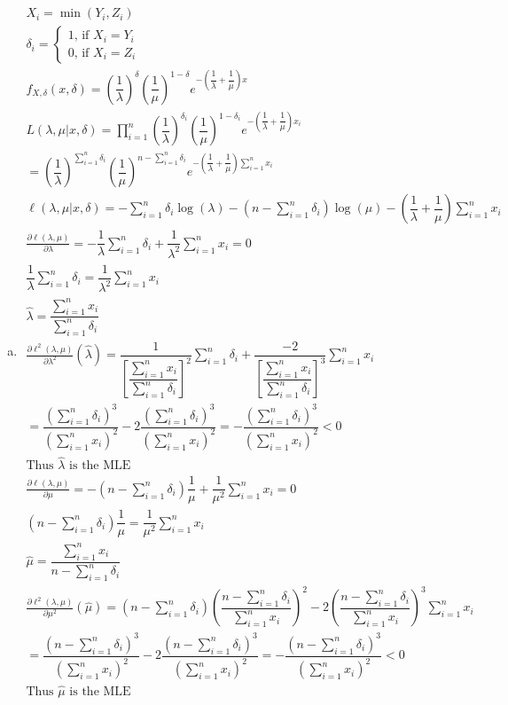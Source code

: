 \documentclass{article}
\newcommand{\pderiv}[2]{\frac{\partial #1}{\partial #2}}
\newcommand{\lm}{\lambda}
\newcommand{\sumn}{\sum_{i=1}^{n}}
\newcommand{\prodn}{\prod_{i=1}^{n}}
\begin{document}
\begin{flushleft}
\begin{enumerate}[(a)]
	\item 
\begin{multline*}\\
X_i=\min(Y_i,Z_i) \\
\delta_i=\begin{cases}
1\text{, if } X_i=Y_i\\
0\text{, if } X_i=Z_i
\end{cases}\\
f_{X,\delta}(x,\delta)=\left(\dfrac{1}{\lm}\right)^{\delta}\left(\dfrac{1}{\mu}\right)^{1-\delta}e^{-\left(\dfrac{1}{\lm}+\dfrac{1}{\mu}\right)x}\\
L(\lm,\mu|x,\delta)=\prodn \left(\dfrac{1}{\lm}\right)^{\delta_i}\left(\dfrac{1}{\mu}\right)^{1-\delta_i}e^{-\left(\dfrac{1}{\lm}+\dfrac{1}{\mu}\right)x_i}\\
=\left(\dfrac{1}{\lm}\right)^{\sumn\delta_i}\left(\dfrac{1}{\mu}\right)^{n-\sumn \delta_i}e^{-\left(\dfrac{1}{\lm}+\dfrac{1}{\mu}\right)\sumn x_i}\\
\ell(\lm,\mu|x,\delta)=-\sumn\delta_i \log(\lambda)-(n-\sumn \delta_i)\log(\mu)-\left(\dfrac{1}{\lm}+\dfrac{1}{\mu}\right)\sumn x_i\\
\pderiv{\ell(\lm,\mu)}{\lm}=-\dfrac{1}{\lm}\sumn\delta_i +\dfrac{1}{\lm^2} \sumn x_i=0\\
\dfrac{1}{\lm}\sumn\delta_i=\dfrac{1}{\lm^2} \sumn x_i\\
\hat{\lm}= \dfrac{\sumn x_i}{\sumn\delta_i}\\
\pderiv{\ell^2(\lm,\mu)}{\lm^2}(\hat{\lm})=\dfrac{1}{\left[\dfrac{\sumn x_i}{\sumn\delta_i}\right]^2}\sumn\delta_i +\dfrac{-2}{\left[\dfrac{\sumn x_i}{\sumn\delta_i}\right]^3} \sumn x_i\\
=\dfrac{\left(\sumn\delta_i\right)^3}{\left(\sumn x_i\right)^2}-2\dfrac{\left(\sumn\delta_i\right)^3}{\left(\sumn x_i\right)^2}=-\dfrac{\left(\sumn\delta_i\right)^3}{\left(\sumn x_i\right)^2}<0\\
\text{Thus } \hat{\lm} \text{ is the MLE}\\
\pderiv{\ell(\lm,\mu)}{\mu}=-(n-\sumn \delta_i)\dfrac{1}{\mu}+\dfrac{1}{\mu^2}\sumn x_i=0\\
(n-\sumn \delta_i)\dfrac{1}{\mu}=\dfrac{1}{\mu^2}\sumn x_i\\
\hat{\mu}=\dfrac{\sumn x_i}{n-\sumn \delta_i}\\
\pderiv{\ell^2(\lm,\mu)}{\mu^2}(\hat{\mu})=(n-\sumn \delta_i)\left(\dfrac{n-\sumn \delta_i}{\sumn x_i}\right)^2-2\left(\dfrac{n-\sumn \delta_i}{\sumn x_i}\right)^3\sumn x_i\\
=\dfrac{\left(n-\sumn \delta_i\right)^3}{\left(\sumn x_i\right)^2}-2\dfrac{\left(n-\sumn \delta_i\right)^3}{\left(\sumn x_i\right)^2}=-\dfrac{\left(n-\sumn \delta_i\right)^3}{\left(\sumn x_i\right)^2}<0\\
\text{Thus } \hat{\mu} \text{ is the MLE}\\
\end{multline*}


\end{enumerate}
\end{flushleft}
\end{document}
